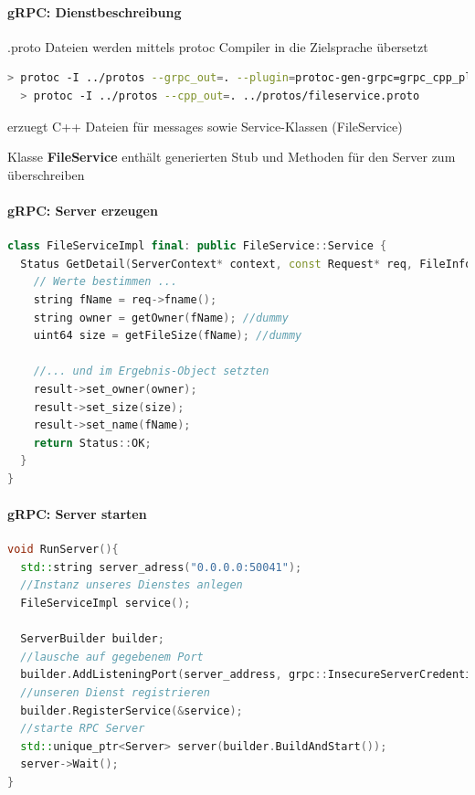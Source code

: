 \documentclass[10pt]{article}
\begin{document}
\paragraph{gRPC: Dienstbeschreibung}

\begin{itemize*}
  \item *.proto Dateien werden mittels protoc Compiler in die Zielsprache übersetzt
  \begin{lstlisting}[language=bash]
  > protoc -I ../protos --grpc_out=. --plugin=protoc-gen-grpc=grpc_cpp_plugin ../protos/fileservice.proto
  > protoc -I ../protos --cpp_out=. ../protos/fileservice.proto
  \end{lstlisting}
  \item erzuegt C++ Dateien für messages sowie Service-Klassen (FileService)
  \item Klasse \textbf{FileService} enthält generierten Stub und  Methoden für den Server zum überschreiben
\end{itemize*}

\paragraph{gRPC: Server erzeugen}
\begin{lstlisting}[language=C++]
class FileServiceImpl final: public FileService::Service {
  Status GetDetail(ServerContext* context, const Request* req, FileInfo* result) override {
    // Werte bestimmen ...
    string fName = req->fname();
    string owner = getOwner(fName); //dummy
    uint64 size = getFileSize(fName); //dummy

    //... und im Ergebnis-Object setzten
    result->set_owner(owner);
    result->set_size(size);
    result->set_name(fName);
    return Status::OK;
  }
}
\end{lstlisting}

\paragraph{gRPC: Server starten}
\begin{lstlisting}[language=C++]
void RunServer(){
  std::string server_adress("0.0.0.0:50041");
  //Instanz unseres Dienstes anlegen
  FileServiceImpl service();

  ServerBuilder builder;
  //lausche auf gegebenem Port
  builder.AddListeningPort(server_address, grpc::InsecureServerCredentials());
  //unseren Dienst registrieren
  builder.RegisterService(&service);
  //starte RPC Server
  std::unique_ptr<Server> server(builder.BuildAndStart());
  server->Wait();
}
\end{lstlisting}
\end{document}
